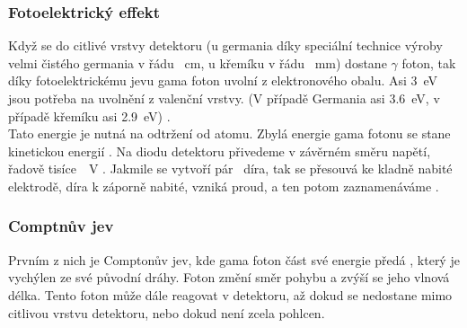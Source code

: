 \subsubsection{Fotoelektrický effekt}
Když se do citlivé vrstvy detektoru (u germania díky speciální technice výroby velmi čistého germania v řádu \SI{}{\centi\meter}, u křemíku v řádu \SI{}{\milli\meter})  \cite{Knoll2010} %
dostane $\gamma$ foton, tak díky fotoelektrickému jevu gama foton uvolní \e z elektronového obalu. Asi \SI{3}{\electronvolt} jsou potřeba na uvolnění \e z valenční vrstvy. (V případě Germania asi \SI{3,6}{\electronvolt}, v případě křemíku asi \SI{2,9}{\electronvolt}) \cite{astrnukleofyzika, nuclear_power-hpge}.\\ %
Tato energie je nutná na odtržení \e od atomu. Zbylá energie gama fotonu se stane kinetickou energií \e.  \cite{semiconductors} %
Na diodu detektoru přivedeme v závěrném směru napětí, řadově tisíce~\SI{}{\volt} \cite{hpge-detector_fabrication}. %
Jakmile se vytvoří pár \e~díra, tak se \e  přesouvá ke kladně nabité elektrodě, díra k záporně nabité, vzniká proud, a ten potom zaznamenáváme \cite{VUT,Knoll2010}. 
\subsubsection{Comptnův jev}
Prvním z nich je Comptonův jev, kde gama foton část své energie předá \e , který je vychýlen ze své původní dráhy. Foton změní směr pohybu a zvýší se jeho vlnová délka. \cite{robert_macku}
Tento foton může dále reagovat v detektoru, až dokud se nedostane mimo citlivou vrstvu detektoru, \break nebo dokud není zcela pohlcen.\\
